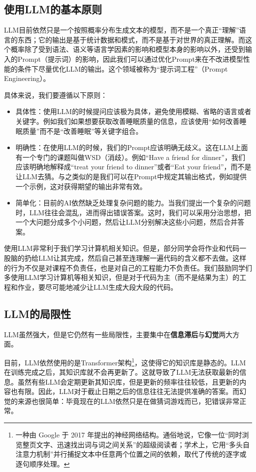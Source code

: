 \documentclass[../main.tex]{subfiles}
\begin{document}
\subsection{使用LLM的基本原则}

LLM目前依然只是一个按照概率分布生成文本的模型，而不是一个真正“理解”语言的东西；它的输出是基于统计数据和模式，而不是基于对世界的真正理解。而这个概率除了受到语法、语义等语言学因素的影响和模型本身的影响以外，还受到输入的Prompt（提示词）的影响，因此我们可以通过优化Prompt来在不改进模型性能的条件下尽量优化LLM的输出。这个领域被称为“提示词工程”（Prompt Engineering）。

具体来说，我们要遵循以下原则：

\begin{itemize}
  \item 具体性：使用LLM的时候提问应该极为具体，避免使用模糊、省略的语言或者关键字。例如我们如果想要获取改善睡眠质量的信息，应该使用“如何改善睡眠质量”而不是“改善睡眠”等关键字组合。
  \item 明确性：在使用LLM的时候，我们的Prompt应该明确无歧义。这在LLM上面有一个专门的课题叫做WSD（消歧）。例如“Have a friend for dinner”，我们应该明确地解释成“treat your friend to dinner”或者“Eat your friend”，而不是让LLM去猜。与之类似的是我们可以在Prompt中规定其输出格式，例如提供一个示例，这对获得期望的输出非常有效。
  \item 简单化：目前的AI依然缺乏处理复杂问题的能力。当我们提出一个复杂的问题时，LLM往往会混乱，进而得出错误答案。这时，我们可以采用分治思想，把一个大问题分成多个小问题，然后让LLM分别解决这些小问题，然后合并答案。
\end{itemize}

\begin{tcolorbox}[title=警告,colback=red!5!white,colframe=red!75!black]
使用LLM非常利于我们学习计算机相关知识。但是，部分同学会将作业和代码一股脑的扔给LLM让其完成，然后自己甚至连理解一遍代码的含义都不去做。这样的行为不仅是对课程不负责任，也是对自己的工程能力不负责任。我们鼓励同学们多使用LLM学习计算机等相关知识，但是对于代码为主（而不是结果为主）的工程和作业，要尽可能地减少让LLM生成大段大段的代码。
\end{tcolorbox}

\subsection{LLM的局限性}

LLM虽然强大，但是它仍然有一些局限性，主要集中在\textbf{信息滞后}与\textbf{幻觉}两大方面。

目前，LLM依然使用的是Transformer架构\footnote{一种由 Google 于 2017 年提出的神经网络结构。通俗地说，它像一位“同时浏览整页文字、迅速找出词与词之间关系”的超级阅读者；学术上，它用“多头自注意力机制”并行捕捉文本中任意两个位置之间的依赖，取代了传统的逐字或逐句顺序处理。}，这使得它的知识库是静态的。LLM在训练完成之后，其知识库就不会再更新了。这就导致了LLM无法获取最新的信息。虽然有些LLM会定期更新其知识库，但是更新的频率往往较低，且更新的内容也有限。因此，LLM对于截止日期之后的信息往往无法提供准确的答案。而幻觉的来源也很简单：毕竟现在的LLM依然只是在做猜词游戏而已，犯错误非常正常。
\end{document}
